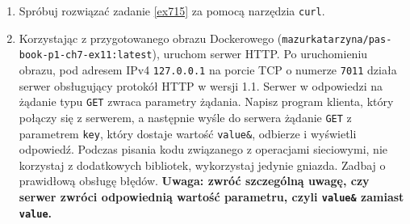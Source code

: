 \documentclass{article}
\begin{document}
\begin{enumerate}[label=\textbf{7.\arabic*}]
\item Spróbuj rozwiązać zadanie \ref{ex715} za pomocą narzędzia \texttt{curl}.  
\item \label{ex717} Korzystając z przygotowanego obrazu Dockerowego (\texttt{mazurkatarzyna/pas-book-p1-ch7-ex11:latest}), uruchom serwer HTTP.  Po uruchomieniu obrazu, pod adresem IPv4 \texttt{127.0.0.1} na porcie TCP o numerze \texttt{7011} działa serwer obsługujący protokół HTTP w wersji 1.1. Serwer w odpowiedzi na żądanie typu \texttt{GET} zwraca parametry żądania. Napisz program klienta, który połączy się z serwerem, a następnie wyśle do serwera żądanie \texttt{GET} z parametrem \texttt{key}, który dostaje wartość \texttt{value\&}, odbierze i wyświetli odpowiedź. Podczas pisania kodu związanego z operacjami sieciowymi, nie korzystaj z dodatkowych bibliotek, wykorzystaj jedynie gniazda. Zadbaj o prawidłową obsługę błędów. \textbf{Uwaga: zwróć szczególną uwagę, czy serwer zwróci odpowiednią wartość parametru, czyli \texttt{value\&} zamiast \texttt{value}.} \




\end{enumerate}
\end{document}
